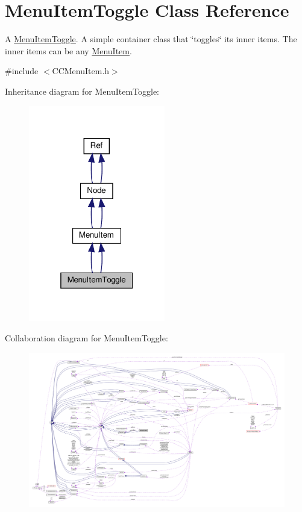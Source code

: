 \hypertarget{classMenuItemToggle}{}\section{Menu\+Item\+Toggle Class Reference}
\label{classMenuItemToggle}


A \hyperlink{classMenuItemToggle}{Menu\+Item\+Toggle}. A simple container class that \char`\"{}toggles\char`\"{} it\textquotesingle{}s inner items. The inner items can be any \hyperlink{classMenuItem}{Menu\+Item}.  




{\ttfamily \#include $<$C\+C\+Menu\+Item.\+h$>$}



Inheritance diagram for Menu\+Item\+Toggle\+:
\nopagebreak
\begin{figure}[H]
\begin{center}
\leavevmode
\includegraphics[width=169pt]{classMenuItemToggle__inherit__graph}
\end{center}
\end{figure}


Collaboration diagram for Menu\+Item\+Toggle\+:
\nopagebreak
\begin{figure}[H]
\begin{center}
\leavevmode
\includegraphics[width=350pt]{classMenuItemToggle__coll__graph}
\end{center}
\end{figure}
